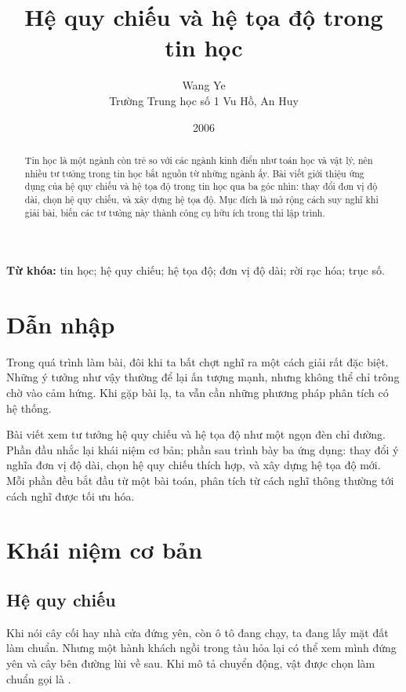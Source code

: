 \documentclass[11pt]{article}
\title{Hệ quy chiếu và hệ tọa độ trong tin học}
\author{Wang Ye\\Trường Trung học số 1 Vu Hồ, An Huy}
\date{2006}
\begin{document}
\maketitle


\renewcommand{\abstractname}{Tóm tắt}
\begin{abstract}
Tin học là một ngành còn trẻ so với các ngành kinh điển như toán học và vật
lý, nên nhiều tư tưởng trong tin học bắt nguồn từ những ngành ấy. Bài viết
giới thiệu ứng dụng của hệ quy chiếu và hệ tọa độ trong tin học qua ba góc
nhìn: thay đổi đơn vị độ dài, chọn hệ quy chiếu, và xây dựng hệ tọa độ. Mục
đích là mở rộng cách suy nghĩ khi giải bài, biến các tư tưởng này thành công
cụ hữu ích trong thi lập trình.
\end{abstract}

\noindent\textbf{Từ khóa:} tin học; hệ quy chiếu; hệ tọa độ; đơn vị độ dài;
rời rạc hóa; trục số.

\section{Dẫn nhập}

Trong quá trình làm bài, đôi khi ta bất chợt nghĩ ra một cách giải rất đặc
biệt. Những ý tưởng như vậy thường để lại ấn tượng mạnh, nhưng không thể chỉ
trông chờ vào cảm hứng. Khi gặp bài lạ, ta vẫn cần những phương pháp phân
tích có hệ thống.

Bài viết xem tư tưởng hệ quy chiếu và hệ tọa độ như một ngọn đèn chỉ đường.
Phần đầu nhắc lại khái niệm cơ bản; phần sau trình bày ba ứng dụng: thay đổi
ý nghĩa đơn vị độ dài, chọn hệ quy chiếu thích hợp, và xây dựng hệ tọa độ mới.
Mỗi phần đều bắt đầu từ một bài toán, phân tích từ cách nghĩ thông thường tới
cách nghĩ được tối ưu hóa.

\section{Khái niệm cơ bản}

\subsection{Hệ quy chiếu}

Khi nói cây cối hay nhà cửa đứng yên, còn ô tô đang chạy, ta đang lấy mặt đất
làm chuẩn. Nhưng một hành khách ngồi trong tàu hỏa lại có thể xem mình đứng
yên và cây bên đường lùi về sau. Khi mô tả chuyển động, vật được chọn làm
chuẩn gọi là .
\end{document}

